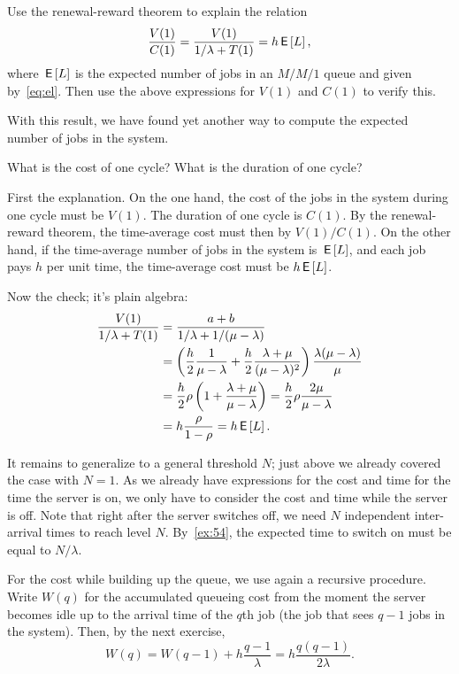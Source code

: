 \documentclass[companion]{subfiles}
\begin{document}
\begin{exercise}
Use the renewal-reward theorem to explain the  relation
\begin{equation*}
  \frac{V(1)}{C(1)} = \frac{V(1)}{1/\lambda + T(1)} = h \,\mathsf{E}\left[L\right],
\end{equation*}
where $\,\mathsf{E}\left[L\right]$ is the expected number of jobs in an $M/M/1$ queue and given by~\cref{eq:el}. Then use the above expressions for $V(1)$ and $C(1)$ to verify this.

With this result, we have found yet another way to compute the expected number of jobs in the system.  
\begin{hint}
  What is the cost of one cycle? What is the duration of one cycle? 
\end{hint}
\begin{solution}
  First the explanation.
  On the one hand, the cost of the jobs in the system during one cycle must be $V(1)$.
  The duration of one cycle is $C(1)$.
  By the renewal-reward theorem, the time-average cost must then by $V(1)/C(1)$.
  On the other hand, if the time-average number of jobs in the system is $\,\mathsf{E}\left[L\right]$, and each job pays $h$ per unit time, the time-average cost must be $h \,\mathsf{E}\left[L\right]$.

  Now the check; it's plain algebra:
\begin{align*}
  \frac{V(1)}{1/\lambda + T(1)}
  &= \frac{a+b}{1/\lambda + 1/(\mu-\lambda)} \\
  &= \left(\frac h 2 \frac 1 {\mu -\lambda} + \frac h 2 \frac{\lambda + \mu}{(\mu - \lambda)^2}\right)\frac{\lambda(\mu-\lambda)}{\mu}\\
&=\frac{h}2 \rho \left(1 + \frac{\lambda+\mu}{\mu-\lambda}\right) = \frac{h}{2} \rho \frac{2\mu}{\mu-\lambda}  \\
&= h \frac{\rho}{1-\rho} = h \,\mathsf{E}\left[L\right]. \\
\end{align*}
\end{solution}
\end{exercise}

It remains to generalize to a general threshold $N$; just above we already covered the case with $N=1$.
As we already have expressions for the cost and time for the time the server is on, we only have to consider the cost and time while the server is off.
Note that right after the server switches off, we need $N$ independent inter-arrival times to reach level $N$.
By~\cref{ex:54}, the expected time  to switch on must be equal to $N/\lambda$.

For the cost while building up the queue, we use again a recursive procedure.
Write $W(q)$ for the accumulated queueing cost from the moment the server becomes idle up to the arrival time of the $q$th job (the job that sees $q-1$ jobs in the system).
Then, by the next exercise,
\begin{equation}\label{eq:99}
  W(q) = W(q-1) + h\frac{q-1}{\lambda} = h \frac{q(q-1)}{2\lambda}.
\end{equation}
\end{document}
